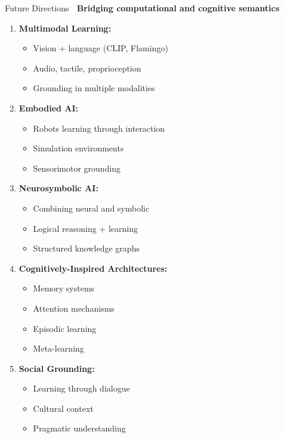 \documentclass[aspectratio=169]{beamer}
\begin{document}
\begin{frame}[shrink=10]{Future Directions 🔮}
\textbf{Bridging computational and cognitive semantics}

\vspace{1em}

\begin{enumerate}\setlength{\itemsep}{0pt}
    \item \textbf{Multimodal Learning:}
    \begin{itemize}\setlength{\itemsep}{0pt}
        \item Vision + language (CLIP, Flamingo)
        \item Audio, tactile, proprioception
        \item Grounding in multiple modalities
    \end{itemize}

    \item \textbf{Embodied AI:}
    \begin{itemize}\setlength{\itemsep}{0pt}
        \item Robots learning through interaction
        \item Simulation environments
        \item Sensorimotor grounding
    \end{itemize}

    \item \textbf{Neurosymbolic AI:}
    \begin{itemize}\setlength{\itemsep}{0pt}
        \item Combining neural and symbolic
        \item Logical reasoning + learning
        \item Structured knowledge graphs
    \end{itemize}

    \item \textbf{Cognitively-Inspired Architectures:}
    \begin{itemize}\setlength{\itemsep}{0pt}
        \item Memory systems
        \item Attention mechanisms
        \item Episodic learning
        \item Meta-learning
    \end{itemize}

    \item \textbf{Social Grounding:}
    \begin{itemize}\setlength{\itemsep}{0pt}
        \item Learning through dialogue
        \item Cultural context
        \item Pragmatic understanding
    \end{itemize}
\end{enumerate}
\end{frame}
\end{document}
